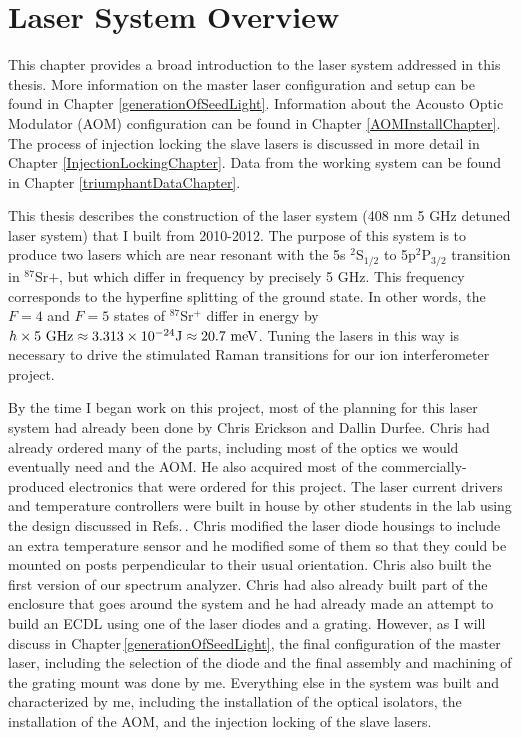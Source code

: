 \chapter{Laser System Overview}

This chapter provides a broad introduction to the laser system addressed in this thesis. More information on the master laser configuration and setup can be found in Chapter \ref{generationOfSeedLight}. Information about the Acousto Optic Modulator (AOM) configuration can be found in Chapter \ref{AOMInstallChapter}. The process of injection locking the slave lasers is discussed in more detail in Chapter \ref{InjectionLockingChapter}. Data from the working system can be found in Chapter \ref{triumphantDataChapter}.

This thesis describes the construction of the laser system (408 nm 5 GHz detuned laser system) that I built from 2010-2012. The purpose of this system is to produce two lasers which are near resonant with the 5s $^2$S$_{1/2}$ to 5p$^2$P$_{3/2}$ transition in $^{87}$Sr$+$, but which differ in frequency by precisely 5 GHz. This frequency corresponds to the hyperfine splitting of the ground state. In other words, the $F=4$ and $F=5$ states of $^{87}$Sr$^+$ differ in energy by $h\times 5\textnormal{ GHz}\approx 3.313 \times 10^{-24} \textnormal{J}\approx 20.7 \textnormal{ meV}$. Tuning the lasers in this way is necessary to drive the stimulated Raman transitions for our ion interferometer project. 

By the time I began work on this project, most of the planning for this laser system had already been done by Chris Erickson and Dallin Durfee. Chris had already ordered many of the parts, including most of the optics we would eventually need and the AOM. He also acquired most of the commercially-produced electronics that were ordered for this project. The laser current drivers and temperature controllers were built in house by other students in the lab using the design discussed in Refs.\,\cite{currentDriver1}\cite{currentDriverNote}\cite{cjeDiss}. Chris modified the laser diode housings to include an extra temperature sensor and he modified some of them so that they could be mounted on posts perpendicular to their usual orientation. Chris also built the first version of our spectrum analyzer. Chris had also already built part of the enclosure that goes around the system and he had already made an attempt to build an ECDL using one of the laser diodes and a grating. However, as I will discuss in Chapter\,\ref{generationOfSeedLight}, the final configuration of the master laser, including the selection of the diode and the final assembly and machining of the grating mount was done by me. Everything else in the system was built and characterized by me, including the installation of the optical isolators, the installation of the AOM, and the injection locking of the slave lasers.

